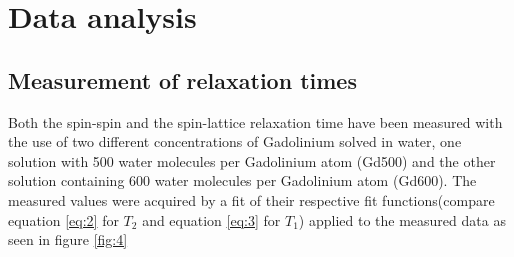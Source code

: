 \section{Data analysis}
\subsection{Measurement of relaxation times}
Both the spin-spin and the spin-lattice relaxation time have been measured with the use of two different concentrations of Gadolinium solved in water, one solution with 500 water molecules per Gadolinium atom (Gd500) and the other solution containing 600 water molecules per Gadolinium atom (Gd600).
The measured values were acquired by a fit of their respective fit functions(compare equation \ref{eq:2} for $T_2$ and equation \ref{eq:3} for $T_1$) applied to the measured data as seen in figure \ref{fig:4}

